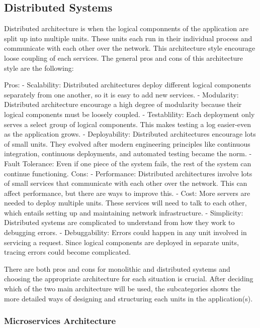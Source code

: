 \subsection[Distributed Systems]{Distributed Systems}\label{sec:newsec}
Distributed architecture is when the logical componnents of the application are split up into multiple units. 
These units each run in their individual process and communicate with each other over the network. 
This architecture style encourage loose coupling of each services. The general pros and cons of this architecture style are the following:

Pros:
-	Scalability: Distributed architectures deploy different logical components separately from one another, so it is easy to add new services.
-	Modularity: Distributed architecture encourage a high degree of modularity because their logical components must be loosely coupled.
-	Testablility: Each deployment only serves a select group of logical components. This makes testing a log easier-even as the application grows.
-	Deployability: Distributed architectures encourage lots of small units. They evolved after modern engineering principles like continuous integration, 
  continuous deployments, and automated testing became the norm.
-	Fault Tolerance: Even if one piece of the system fails, the rest of the system can continue functioning.
Cons:
-	Performance: Distributed architectures involve lots of small services that communicate with each other over the network.
  This can affect performance, but there are ways to improve this.
-	Cost: More servers are needed to deploy multiple units. These services will need to talk to each other, which entails setting up and maintaining network infrastructure.
-	Simplicity: Distributed systems are complicated to understand from how they work to debugging errors.
-	Debuggability: Errors could happen in any unit involved in servicing a request. Since logical components are deployed in separate units,
  tracing errors could become complicated.

There are both pros and cons for monolithic and distributed systems and choosing the appropriate architecture for each situation is crucial.
After deciding which of the two main architecture will be used, the subcategories shows the more detailed ways of designing and structuring each units in the application(s). 

\subsubsection[Microservices Architecture]{Microservices Architecture}

